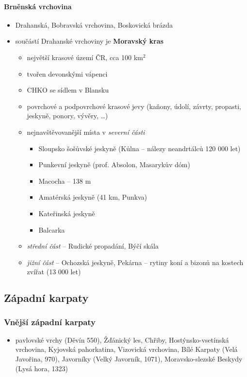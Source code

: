 \paragraph{Brněnská vrchovina}
\begin{itemize}
\item Drahanská, Bobravská vrchovina, Boskovická brázda
\item součástí Drahanské vrchoviny je \textbf{Moravský kras}
	\begin{itemize}
	\item největší krasové území ČR, cca 100 km$^2$
	\item tvořen devonskými vápenci
	\item CHKO se sídlem v Blansku
	\item povrchové a podpovrchové krasové jevy (kaňony, údolí, závrty, propasti, jeskyně, ponory, 
vývěry, \ldots)
	\item nejnavštěvovanější místa v \textit{severní části}
		\begin{itemize}
		\item Sloupsko šošůvské jeskyně (Kůlna -- nálezy neandrtálců 120 000 let)
		\item Punkevní jeskyně (prof. Absolon, Masarykův dóm)
		\item Macocha -- 138 m
		\item Amatérská jeskyně (41 km, Punkva)
		\item Kateřinská jeskyně
		\item Balcarka
		\end{itemize}
	\item \textit{střední část} -- Rudické propadání, Býčí skála
	\item \textit{jižní část} -- Ochozská jeskyně, Pekárna -- rytiny koní a bizonů na kostech zvířat (13 000 let)
	\end{itemize}
\end{itemize}

\subsection{Západní karpaty}
\subsubsection{Vnější západní karpaty}
\begin{itemize}
\item pavlovské vrchy (Děvín 550), Žďánický les, Chřiby, Hostýnsko-vsetínská vrchovina, Kyjovská pahorkatina, Vizovická vrchovina, Bílé Karpaty (Velá Javořina, 970), Javorníky (Velký Javorník, 1071), Moravsko-slezské Beskydy (Lysá hora, 1323)
\end{itemize}

